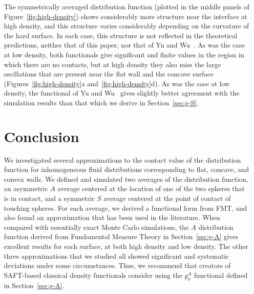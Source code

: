 The symmetrically averaged distribution function (plotted
in the middle panels of Figure~\ref{fig:high-density}) shows considerably
more structure near the interface at high density, and this structure
varies considerably depending on the curvature of the hard surface.
In each case, this structure is not reflected in the theoretical
predictions, neither that of this paper, nor that of Yu and
Wu~\cite{yu2002fmt-dft-inhomogeneous-associating}.  As was the case at
low density, both functionals give significant and finite values in
the region in which there are no contacts, but at high density they
also miss the large oscillations that are present near the flat wall
and the concave surface (Figures~\ref{fig:high-density}a
and~\ref{fig:high-density}d).  As was the case at low density, the
functional of Yu and Wu~\cite{yu2002fmt-dft-inhomogeneous-associating}
gives slightly better agreement with the simulation results than that
which we derive in Section~\ref{sec:g-S}.

\section{Conclusion}
We investigated several approximations to the contact value of the
distribution function for inhomogeneous fluid distributions
corresponding to flat, concave, and convex walls.  We
defined and simulated two averages of the distribution function, an
asymmetric $A$ average centered at the location of one of the two
spheres that is in contact, and a symmetric $S$ average centered at
the point of contact of touching spheres.  For each average, we
derived a functional form from FMT, and also found an approximation
that has been used in the literature.  When compared with essentially
exact Monte Carlo simulations, the $A$ distribution function derived
from Fundamental Measure Theory in Section~\ref{sec:g-A} gives
excellent results for each surface, at both high density and low
density.  The other three approximations that we studied all showed
significant and systematic deviations under some circumstances.  Thus,
we recommend that creators of SAFT-based classical density functionals
consider using the $g_\sigma^A$ functional defined in
Section~\ref{sec:g-A}.

